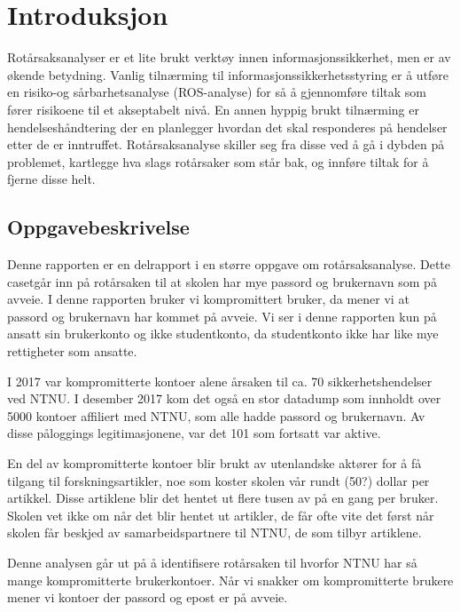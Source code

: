 \chapter{Introduksjon}
\fixme Rotårsaksanalyser er et lite brukt verktøy innen informasjonssikkerhet, men er av økende betydning. Vanlig tilnærming til informasjonssikkerhetsstyring er å utføre en risiko-og sårbarhetsanalyse (ROS-analyse) for så å gjennomføre tiltak som fører risikoene til et akseptabelt nivå. En annen hyppig brukt tilnærming er hendelseshåndtering der en planlegger hvordan det skal responderes på hendelser etter de er inntruffet. Rotårsaksanalyse skiller seg fra disse ved å gå i dybden på problemet, kartlegge hva slags rotårsaker som står bak, og innføre tiltak for å fjerne disse helt.

\section{Oppgavebeskrivelse}
Denne rapporten er en delrapport i en større oppgave om rotårsaksanalyse. Dette casetgår inn på rotårsaken til at skolen har mye passord og brukernavn som på avveie. I denne rapporten bruker vi kompromittert bruker, da mener vi at passord og brukernavn har kommet på avveie. Vi ser i denne rapporten kun på ansatt sin brukerkonto og ikke studentkonto, da studentkonto ikke har like mye rettigheter som ansatte.

I 2017 var kompromitterte kontoer alene årsaken til ca. 70 sikkerhetshendelser ved NTNU. I desember 2017 kom det også en stor datadump som innholdt over 5000 kontoer affiliert med NTNU, som alle hadde passord og brukernavn. Av disse påloggings legitimasjonene, var det 101 som fortsatt var aktive. 

En del av kompromitterte kontoer blir brukt av utenlandske aktører for å få tilgang til forskningsartikler, noe som koster skolen vår rundt (50?) dollar per artikkel. Disse artiklene blir det hentet ut flere tusen av på en gang per bruker. Skolen vet ikke om når det blir hentet ut artikler, de får ofte vite det først når skolen får beskjed av samarbeidspartnere til NTNU, de som tilbyr artiklene.

Denne analysen går ut på å identifisere rotårsaken til hvorfor NTNU har så mange kompromitterte brukerkontoer. Når vi snakker om kompromitterte brukere mener vi kontoer der passord og epost er på avveie.  


